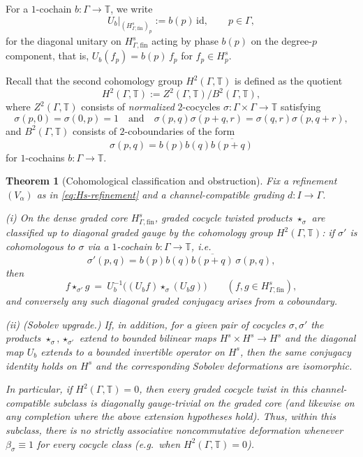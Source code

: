 \documentclass[11pt]{amsart}
\theoremstyle{plain}
\newtheorem{theorem}{Theorem}[section]
\theoremstyle{definition}
\theoremstyle{remark}
\newcommand{\bbT}{\mathbb{T}}
\begin{document}
For a $1$-cochain $b:\Gamma\to\bbT$, we write
\[
U_b\big|_{(H^s_{\Gamma,\mathrm{fin}})_p} := b(p)\,\mathrm{id},
\qquad p\in\Gamma,
\]
for the diagonal unitary on $H^s_{\Gamma,\mathrm{fin}}$ acting by phase $b(p)$ on the degree-$p$ component, that is, $U_b(f_p)=b(p)\,f_p$ for $f_p\in H^s_p$.

Recall that the second cohomology group $H^2(\Gamma,\bbT)$ is defined \cite{BrownCohomology} as the quotient
\[
H^2(\Gamma,\bbT)
:=
Z^2(\Gamma,\bbT)\big/ B^2(\Gamma,\bbT),
\]
where $Z^2(\Gamma,\bbT)$ consists of \emph{normalized} $2$-cocycles $\sigma:\Gamma\times\Gamma\to\bbT$
satisfying
\[
\sigma(p,0)=\sigma(0,p)=1
\quad\text{and}\quad
\sigma(p,q)\sigma(p+q,r)=\sigma(q,r)\sigma(p,q+r),
\]
and $B^2(\Gamma,\bbT)$ consists of $2$-coboundaries of the form
\[
\sigma(p,q)=b(p)b(q)\overline{b(p+q)}
\]
for $1$-cochains $b:\Gamma\to\bbT$.

\begin{theorem}[Cohomological classification and obstruction]\label{thm:cohomological-obstruction}
Fix a refinement $(V_\alpha)$ as in \eqref{eq:Hs-refinement} and a channel-compatible grading $d:I\to\Gamma$.

\smallskip
\noindent (i) On the dense graded core $H^s_{\Gamma,\mathrm{fin}}$, graded cocycle twisted products $\star_\sigma$ are classified up to diagonal graded gauge
by the cohomology group $H^2(\Gamma,\bbT)$: if $\sigma'$ is cohomologous to $\sigma$ via a $1$-cochain $b:\Gamma\to\bbT$, i.e.
\[
\sigma'(p,q)=b(p)b(q)\overline{b(p+q)}\,\sigma(p,q),
\]
then
\[
f\star_{\sigma'} g \ =\ U_b^{-1}\bigl((U_b f)\star_\sigma (U_b g)\bigr)\qquad (f,g\in H^s_{\Gamma,\mathrm{fin}}),
\]
and conversely any such diagonal graded conjugacy arises from a coboundary.

\smallskip
\noindent (ii) (\emph{Sobolev upgrade.})
If, in addition, for a given pair of cocycles $\sigma,\sigma'$ the products $\star_\sigma,\star_{\sigma'}$ extend to bounded bilinear maps
$H^s\times H^s\to H^s$ \emph{and} the diagonal map $U_b$ extends to a bounded invertible operator on $H^s$,
then the same conjugacy identity holds on $H^s$ and the corresponding Sobolev deformations are isomorphic.

\smallskip
\noindent In particular, if $H^2(\Gamma,\bbT)=0$, then every graded cocycle twist in this channel-compatible subclass is diagonally gauge-trivial
on the graded core (and likewise on any completion where the above extension hypotheses hold).  Thus, within this subclass, there is no strictly associative
noncommutative deformation whenever $\beta_\sigma\equiv 1$ for every cocycle class (e.g.\ when $H^2(\Gamma,\bbT)=0$).
\end{theorem}
\end{document}
